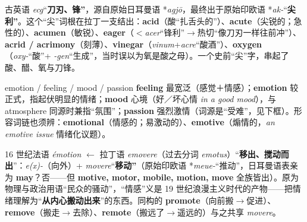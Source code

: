 \documentclass[../main.tex]{subfiles}
\begin{document}



\begin{origin}
古英语 \textit{ecg}“\textbf{刀刃、锋”}，源自原始日耳曼语 *\textit{agjō}，最终出于原始印欧语 *\textit{ak-}“\textbf{尖利”}。这个“尖”词根在拉丁一支结出：\textbf{acid}（酸“扎舌头的”）、\textbf{acute}（尖锐的；急性的）、\textbf{acumen}（敏锐）、\textbf{eager}（$<$\textit{acer}“锋利”$\to$热切“像刀刃一样往前冲”）、\textbf{acrid / acrimony}（刻薄）、\textbf{vinegar}（\textit{vinum}+\textit{acre}“酸酒”）、\textbf{oxygen}（\textit{oxy-}“酸”+ \textit{-gen}“生成”，当时误以为氧是酸之母）。一个史前“尖”字，串起了酸、醋、氧与刀锋。
\end{origin}



\begin{gram}{emotion / feeling / mood / passion}
\textbf{feeling} 最宽泛（感觉＋情感）；\textbf{emotion} 较正式，指起伏明显的情绪；\textbf{mood} 心境（好／坏心情 \textit{in a good mood}），与 atmosphere 同源时兼指“氛围”；\textbf{passion} 强烈激情（词源是“受难”，见下框）。形容词链也须辨：\textbf{emotional}（情感的；易激动的）、\textbf{emotive}（煽情的，\textit{an emotive issue} 情绪化议题）。
\end{gram}

\begin{origin}
16 世纪法语 \textit{émotion} $\leftarrow$ 拉丁语 \textit{emovere}（过去分词 \textit{emotus}）“\textbf{移出、搅动而出}”：\textit{e(x)-}（向外）+ \textit{movere}“\textbf{移动”}（原始印欧语 *\textit{meue-}“推动”，日耳曼语表亲为 \textbf{may}？否——但 \textbf{motive, motor, mobile, motion, move} 全族皆出）。原为物理与政治用语“民众的骚动”，“情感”义是 19 世纪浪漫主义时代的产物——把情绪理解为“\textbf{从内心搬动出来}”的东西。同构的 \textbf{promote}（向前搬$\to$促进）、\textbf{remove}（搬走$\to$去除）、\textbf{remote}（搬远了$\to$遥远的）与之共享 \textit{movere}。
\end{origin}
\end{document}
